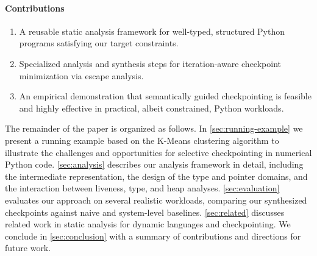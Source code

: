 \paragraph{Contributions}
\begin{enumerate}
\item A reusable static analysis framework for well-typed, structured Python programs satisfying our target constraints.
\item Specialized analysis and synthesis steps for iteration-aware checkpoint minimization via escape analysis.
\item An empirical demonstration that semantically guided checkpointing is feasible and highly effective in practical, albeit constrained, Python workloads.
\end{enumerate}

The remainder of the paper is organized as follows. In \autoref{sec:running-example} we present a running example based on the K-Means clustering algorithm to illustrate the challenges and opportunities for selective checkpointing in numerical Python code. \autoref{sec:analysis} describes our analysis framework in detail, including the intermediate representation, the design of the type and pointer domains, and the interaction between liveness, type, and heap analyses. \autoref{sec:evaluation} evaluates our approach on several realistic workloads, comparing our synthesized checkpoints against naive and system-level baselines. \autoref{sec:related} discusses related work in static analysis for dynamic languages and checkpointing. We conclude in \autoref{sec:conclusion} with a summary of contributions and directions for future work.
